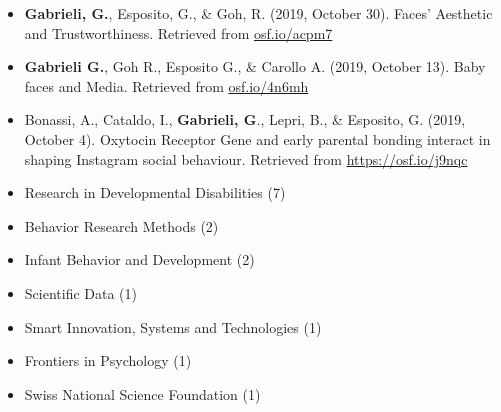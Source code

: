 \documentclass[10pt,a4paper]{altacv}
\begin{document}
\begin{fullwidth}
\begin{itemize}
			\item \textbf{Gabrieli, G.}, Esposito, G., \& Goh, R. (2019, October 30). Faces' Aesthetic and Trustworthiness. Retrieved from \href{https://osf.io/acpm7}{osf.io/acpm7}
			
			\item \textbf{Gabrieli G.}, Goh R., Esposito G., \& Carollo A. (2019, October 13). Baby faces and Media. Retrieved from \href{https://osf.io/4n6mh}{osf.io/4n6mh} 
			
			\item Bonassi, A., Cataldo, I., \textbf{Gabrieli, G}., Lepri, B., \& Esposito, G. (2019, October 4). Oxytocin Receptor Gene and early parental bonding interact in shaping Instagram social behaviour. Retrieved from \href{https://osf.io/j9nqc}{https://osf.io/j9nqc} 
			
		\end{itemize}
		
		\begin{itemize}
			\item Research in Developmental Disabilities (7)
			\item Behavior Research Methods (2)
			\item Infant Behavior and Development (2)
			\item Scientific Data (1)
			\item Smart Innovation, Systems and Technologies (1)
			\item Frontiers in Psychology (1)
			\item Swiss National Science Foundation (1)
		\end{itemize}
		
		\divider
		
		
		
		\divider
		
		
		\divider		
		
		
		\divider
		
		
		\divider
		
		\newpage
		

\end{fullwidth}
\end{document}

